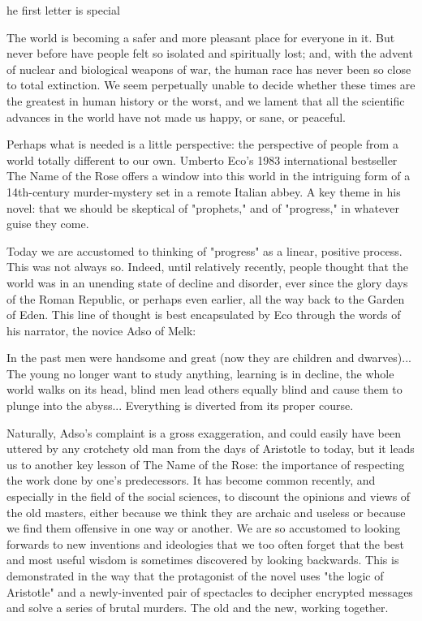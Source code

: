 \label{ch:the-name-of-the-rose}

he first letter is special



   The world is becoming a safer and more pleasant place for everyone in
   it. But never before have people felt so isolated and spiritually lost;
   and, with the advent of nuclear and biological weapons of war, the
   human race has never been so close to total extinction. We seem
   perpetually unable to decide whether these times are the greatest in
   human history or the worst, and we lament that all the scientific
   advances in the world have not made us happy, or sane, or peaceful.

   Perhaps what is needed is a little perspective: the perspective of
   people from a world totally different to our own. Umberto Eco's 1983
   international bestseller The Name of the Rose offers a window into this
   world in the intriguing form of a 14th-century murder-mystery set in a
   remote Italian abbey. A key theme in his novel: that we should be
   skeptical of "prophets," and of "progress," in whatever guise they
   come.

   Today we are accustomed to thinking of "progress" as a linear, positive
   process. This was not always so. Indeed, until relatively recently,
   people thought that the world was in an unending state of decline and
   disorder, ever since the glory days of the Roman Republic, or perhaps
   even earlier, all the way back to the Garden of Eden. This line of
   thought is best encapsulated by Eco through the words of his narrator,
   the novice Adso of Melk:

     In the past men were handsome and great (now they are children and
     dwarves)... The young no longer want to study anything, learning is
     in decline, the whole world walks on its head, blind men lead others
     equally blind and cause them to plunge into the abyss... Everything
     is diverted from its proper course.

   Naturally, Adso's complaint is a gross exaggeration, and could easily
   have been uttered by any crotchety old man from the days of Aristotle
   to today, but it leads us to another key lesson of The Name of the
   Rose: the importance of respecting the work done by one's predecessors.
   It has become common recently, and especially in the field of the
   social sciences, to discount the opinions and views of the old masters,
   either because we think they are archaic and useless or because we find
   them offensive in one way or another. We are so accustomed to
   looking forwards to new inventions and ideologies that we too often
   forget that the best and most useful wisdom is sometimes discovered by
   looking backwards. This is demonstrated in the way that the protagonist
   of the novel uses "the logic of Aristotle" and a newly-invented pair of
   spectacles to decipher encrypted messages and solve a series of brutal
   murders. The old and the new, working together.

